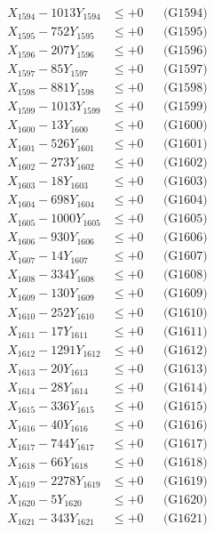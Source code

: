 \documentclass[a4paper,10pt]{article}
\begin{document}
{\begin{align}
X_{1594} - 1013Y_{1594} &\leq +0 && \text{(G1594)} \\
X_{1595} - 752Y_{1595} &\leq +0 && \text{(G1595)} \\
X_{1596} - 207Y_{1596} &\leq +0 && \text{(G1596)} \\
X_{1597} - 85Y_{1597} &\leq +0 && \text{(G1597)} \\
X_{1598} - 881Y_{1598} &\leq +0 && \text{(G1598)} \\
X_{1599} - 1013Y_{1599} &\leq +0 && \text{(G1599)} \\
X_{1600} - 13Y_{1600} &\leq +0 && \text{(G1600)} \\
\allowbreak
X_{1601} - 526Y_{1601} &\leq +0 && \text{(G1601)} \\
X_{1602} - 273Y_{1602} &\leq +0 && \text{(G1602)} \\
X_{1603} - 18Y_{1603} &\leq +0 && \text{(G1603)} \\
X_{1604} - 698Y_{1604} &\leq +0 && \text{(G1604)} \\
X_{1605} - 1000Y_{1605} &\leq +0 && \text{(G1605)} \\
X_{1606} - 930Y_{1606} &\leq +0 && \text{(G1606)} \\
X_{1607} - 14Y_{1607} &\leq +0 && \text{(G1607)} \\
X_{1608} - 334Y_{1608} &\leq +0 && \text{(G1608)} \\
X_{1609} - 130Y_{1609} &\leq +0 && \text{(G1609)} \\
X_{1610} - 252Y_{1610} &\leq +0 && \text{(G1610)} \\
\allowbreak
X_{1611} - 17Y_{1611} &\leq +0 && \text{(G1611)} \\
X_{1612} - 1291Y_{1612} &\leq +0 && \text{(G1612)} \\
X_{1613} - 20Y_{1613} &\leq +0 && \text{(G1613)} \\
X_{1614} - 28Y_{1614} &\leq +0 && \text{(G1614)} \\
X_{1615} - 336Y_{1615} &\leq +0 && \text{(G1615)} \\
X_{1616} - 40Y_{1616} &\leq +0 && \text{(G1616)} \\
X_{1617} - 744Y_{1617} &\leq +0 && \text{(G1617)} \\
X_{1618} - 66Y_{1618} &\leq +0 && \text{(G1618)} \\
X_{1619} - 2278Y_{1619} &\leq +0 && \text{(G1619)} \\
X_{1620} - 5Y_{1620} &\leq +0 && \text{(G1620)} \\
\allowbreak
X_{1621} - 343Y_{1621} &\leq +0 && \text{(G1621)} \\

\end{align}}
\end{document}

